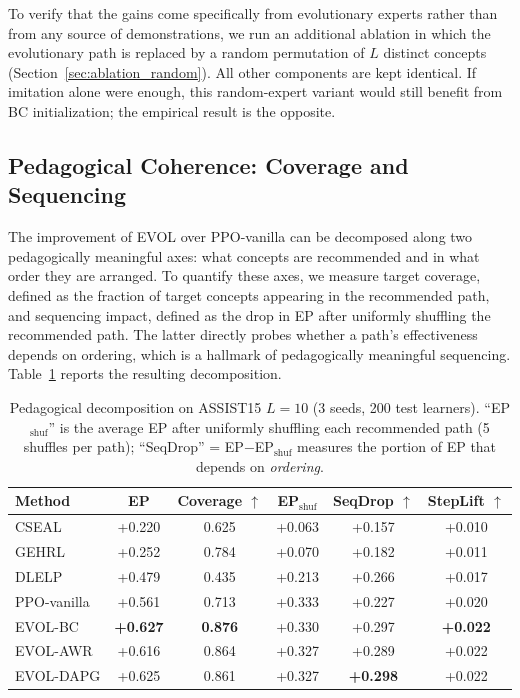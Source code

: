 \documentclass[sigconf,anonymous]{acmart}
\newcommand{\ours}{\textrm{EVOL}}
\begin{document}
To verify that the gains come specifically from evolutionary experts rather than from any source of demonstrations, we run an additional ablation in which the evolutionary path is replaced by a random permutation of $L$ distinct concepts (Section~\ref{sec:ablation_random}). All other components are kept identical. If imitation alone were enough, this random-expert variant would still benefit from BC initialization; the empirical result is the opposite.

\subsection{Pedagogical Coherence: Coverage and Sequencing}
\label{sec:pedagogical}

The improvement of \ours{} over PPO-vanilla can be decomposed along two pedagogically meaningful axes: what concepts are recommended and in what order they are arranged. To quantify these axes, we measure target coverage, defined as the fraction of target concepts appearing in the recommended path, and sequencing impact, defined as the drop in EP after uniformly shuffling the recommended path. The latter directly probes whether a path's effectiveness depends on ordering, which is a hallmark of pedagogically meaningful sequencing. Table~\ref{tab:pedagogical} reports the resulting decomposition.


\begin{table}[t]
\centering
\caption{Pedagogical decomposition on ASSIST15 $L\!=\!10$ (3 seeds, 200 test learners). ``EP$_\text{shuf}$'' is the average EP after uniformly shuffling each recommended path (5 shuffles per path); ``SeqDrop'' = EP$-$EP$_\text{shuf}$ measures the portion of EP that depends on \emph{ordering}.}
\label{tab:pedagogical}
\small
\begin{tabular}{@{}lccccc@{}}
\toprule
Method & EP & Coverage $\uparrow$ & EP$_\text{shuf}$ & SeqDrop $\uparrow$ & StepLift $\uparrow$ \\
\midrule
CSEAL          & +0.220 & 0.625 & +0.063 & +0.157 & +0.010 \\
GEHRL          & +0.252 & 0.784 & +0.070 & +0.182 & +0.011 \\
DLELP          & +0.479 & 0.435 & +0.213 & +0.266 & +0.017 \\
PPO-vanilla    & +0.561 & 0.713 & +0.333 & +0.227 & +0.020 \\
\midrule
\ours{}-BC     & \textbf{+0.627} & \textbf{0.876} & +0.330 & +0.297 & \textbf{+0.022} \\
\ours{}-AWR    & +0.616          & 0.864          & +0.327 & +0.289 & +0.022 \\
\ours{}-DAPG   & +0.625          & 0.861          & +0.327 & \textbf{+0.298} & +0.022 \\
\bottomrule
\end{tabular}
\end{table}
\end{document}
